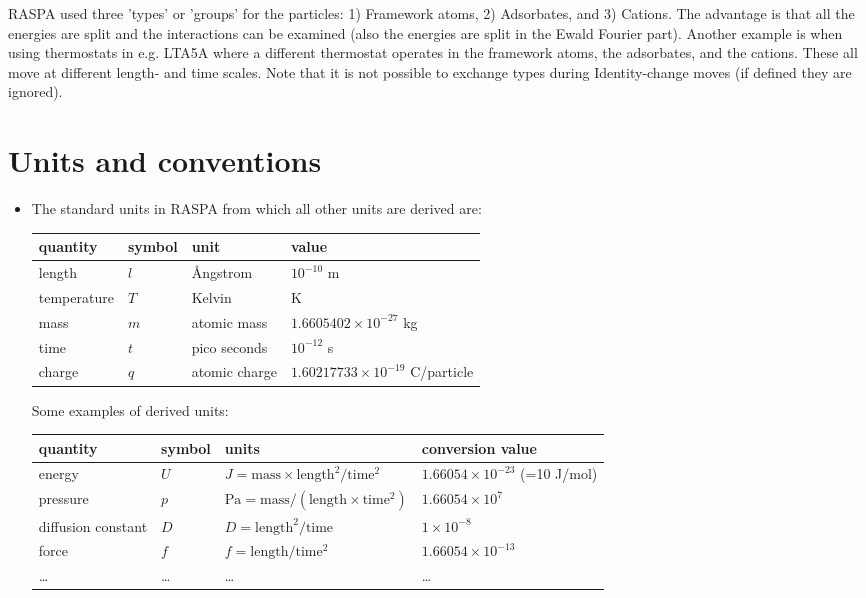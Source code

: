 RASPA used three 'types' or 'groups' for the particles: 1) Framework atoms, 2) Adsorbates, and 3) Cations. The advantage is that
all the energies are split and the interactions can be examined (also the energies are split in the Ewald Fourier part).
Another example is when using thermostats in e.g. LTA5A where a different thermostat operates in the framework atoms, the adsorbates,
and the cations. These all move at different length- and time scales. Note that it is not possible to exchange types during
Identity-change moves (if defined they are ignored).


\section{Units and conventions}
\begin{itemize}
\item{The standard units in RASPA from which all other units are derived are:}\\
\vskip 0.1cm
\begin{tabularx}{\linewidth}{l|l|l|l}
 quantity & symbol & unit & value\\
\hline
 length      & $l$    & \AA ngstrom   & $10^{-10}$ m\\
 temperature & $T$    & Kelvin        & K\\
 mass        & $m$    & atomic mass   & $1.6605402\times 10^{-27}$ kg\\
 time        & $t$    & pico seconds  & $10^{-12}$ s\\
 charge      & $q$    & atomic charge & $1.60217733\times 10^{-19}$ C/particle\\
\hline
\end{tabularx}
\vskip 0.1cm

\noindent Some examples of derived units:\\

\begin{tabularx}{\linewidth}{l|l|l|l}
 quantity & symbol & units & conversion value\\
\hline
 energy             & $U$    & $J=\text{mass}\times\text{length}^2/\text{time}^2$ & $1.66054\times10^{-23}$ (=10 J/mol)\\
 pressure           & $p$    & $\text{Pa}=\text{mass}/(\text{length}\times\text{time}^2)$  & $1.66054\times10^7$\\
 diffusion constant & $D$    & $D=\text{length}^2/\text{time}$ & $1\times10^{-8}$\\
 force              & $f$    & $f=\text{length}/\text{time}^2$ & $1.66054\times 10^{-13}$\\
 \dots              & \dots  & \dots                                & \dots \\
\hline
\end{tabularx}\\


\end{itemize}
